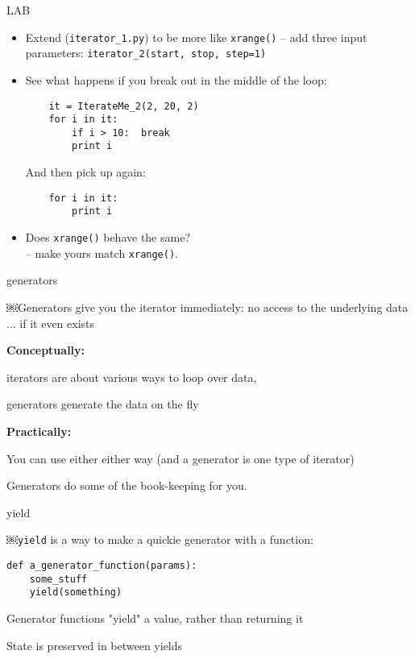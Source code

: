 \documentclass{beamer}
\begin{document}
\begin{frame}[fragile]{LAB}

\begin{itemize}
  \item  Extend (\verb|iterator_1.py|) to be more like \verb|xrange()| --
         add three input parameters: \verb|iterator_2(start, stop, step=1)|
  \item  See what happens if you break out in the middle of the loop:
\begin{verbatim}
    it = IterateMe_2(2, 20, 2)
    for i in it:
        if i > 10:  break
        print i
\end{verbatim}
And then pick up again:
\begin{verbatim}
    for i in it:
        print i
\end{verbatim}
  \item  Does \verb|xrange()| behave the same?\\
          -- make yours match \verb|xrange()|.
\end{itemize}
\end{frame}

\begin{frame}[fragile]{generators}

\Large{￼Generators give you the iterator immediately:
no access to the underlying data ... if it even exists}

\vfill
{\bf Conceptually:}

iterators are about various ways to loop over data,

generators generate the data on the fly

\vfill
{\bf Practically:}

You can use either either way (and a generator is one type of iterator)

Generators do some of the book-keeping for you.

\end{frame}

\begin{frame}[fragile]{yield}

\Large{￼\verb|yield| is a way to make a quickie generator with a function:}

\begin{verbatim}
def a_generator_function(params):
    some_stuff
    yield(something)
\end{verbatim}

\vfill
\Large{ Generator functions "yield" a value, rather than returning it }

\vfill
\Large{ State is preserved in between yields }

\end{frame}
\end{document}
